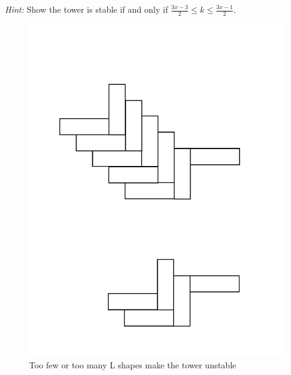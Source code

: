 \documentclass[12pt]{article}
\begin{document}
\emph{Hint:}  Show the tower is stable if and only if $\frac{3x - 3}{2} \leq  k \leq \frac{3x - 1}{2} $.

\begin{figure}[h]

\centering
\includegraphics[scale=0.4, angle=-90]{Diagram1}
\caption{Too few or too many L shapes make the tower unstable \label{fig:towers}}
\end{figure}
\end{document}
